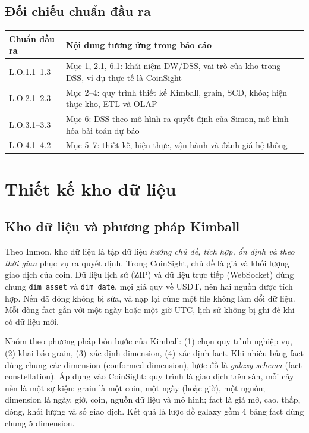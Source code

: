\documentclass[11pt,a4paper]{article}
\newcommand{\code}[1]{\texttt{#1}}
\begin{document}
\subsection{Đối chiếu chuẩn đầu ra}
\begin{table}[H]
\centering\small
\begin{tabularx}{\linewidth}{lX}
\toprule
\textbf{Chuẩn đầu ra} & \textbf{Nội dung tương ứng trong báo cáo} \\
\midrule
L.O.1.1--1.3 & Mục 1, 2.1, 6.1: khái niệm DW/DSS, vai trò của kho trong DSS, ví dụ thực tế là CoinSight \\
L.O.2.1--2.3 & Mục 2--4: quy trình thiết kế Kimball, grain, SCD, khóa; hiện thực kho, ETL và OLAP \\
L.O.3.1--3.3 & Mục 6: DSS theo mô hình ra quyết định của Simon, mô hình hóa bài toán dự báo \\
L.O.4.1--4.2 & Mục 5--7: thiết kế, hiện thực, vận hành và đánh giá hệ thống \\
\bottomrule
\end{tabularx}
\end{table}

\section{Thiết kế kho dữ liệu}\label{sec:dw}

\subsection{Kho dữ liệu và phương pháp Kimball}
Theo Inmon, kho dữ liệu là tập dữ liệu \emph{hướng chủ đề, tích hợp, ổn định và theo thời gian}
phục vụ ra quyết định. Trong CoinSight, chủ đề là giá và khối lượng giao dịch của coin.
Dữ liệu lịch sử (ZIP) và dữ liệu trực tiếp (WebSocket) dùng chung \code{dim\_asset} và
\code{dim\_date}, mọi giá quy về USDT, nên hai nguồn được tích hợp. Nến đã đóng không bị sửa,
và nạp lại cùng một file không làm đổi dữ liệu. Mỗi dòng fact gắn với một ngày hoặc một giờ
UTC, lịch sử không bị ghi đè khi có dữ liệu mới.

Nhóm theo phương pháp bốn bước của Kimball: (1) chọn quy trình nghiệp vụ, (2) khai báo grain,
(3) xác định dimension, (4) xác định fact. Khi nhiều bảng fact dùng chung các dimension
(conformed dimension), lược đồ là \emph{galaxy schema} (fact constellation). Áp dụng vào
CoinSight: quy trình là giao dịch trên sàn, mỗi cây nến là một sự kiện; grain là một coin, một
ngày (hoặc giờ), một nguồn; dimension là ngày, giờ, coin, nguồn dữ liệu và mô hình; fact là giá
mở, cao, thấp, đóng, khối lượng và số giao dịch. Kết quả là lược đồ galaxy gồm 4 bảng fact dùng
chung 5 dimension.
\end{document}

